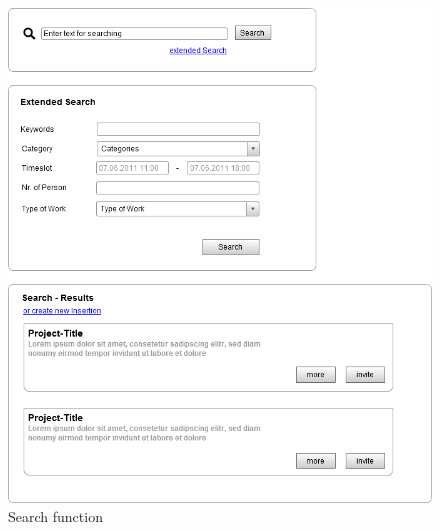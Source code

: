\documentclass[a4paper,oneside,titlepage]{article}
\begin{document}
\begin{figure}[h]
    \includegraphics[width=\textwidth]{search}
  \caption{Search function}
  \label{search}
\end{figure}
\end{document}
